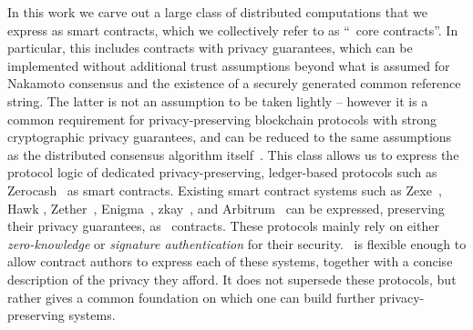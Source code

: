 In this work we carve out a large class of distributed computations that we
express as smart contracts, which we collectively refer to as ``\kachina\ core
contracts''. In particular, this includes contracts with privacy guarantees,
which can be implemented without additional trust assumptions beyond what is
assumed for Nakamoto consensus and the existence of a securely generated common
reference string.
The latter is not
an assumption to be taken lightly -- however it is a common requirement for
privacy-preserving blockchain protocols with strong cryptographic privacy
guarantees, and can be reduced to the same assumptions as the distributed
  consensus algorithm itself~\cite{pistis}. This
class allows us to express the protocol logic of dedicated privacy-preserving,
ledger-based protocols such as Zerocash~\cite{SP:BCGGMT14} as smart contracts.
Existing smart contract systems such as Zexe~\cite{zexe},
Hawk \cite{SP:KMSWP16}, Zether~\cite{zether}, Enigma~\cite{enigmapaper},
zkay~\cite{CCS:SBGMTV19}, and
Arbitrum~\cite{USENIX:KGCWF18} can be expressed, preserving their privacy
guarantees, as \kachina\ contracts. These protocols mainly rely on either
\emph{zero-knowledge} or \emph{signature authentication} for their security.
\kachina\ is flexible enough to allow contract authors to
express each of these systems, together with a concise description of the privacy
they afford. It does not supersede these protocols, but rather gives
 a common foundation on which one can build further privacy-preserving
systems.

